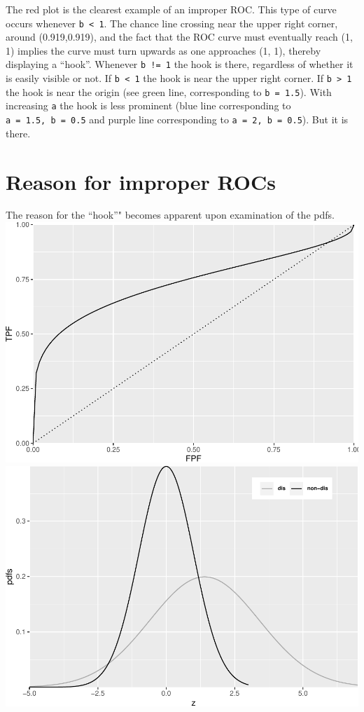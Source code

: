 \documentclass[]{book}
\begin{document}
The red plot is the clearest example of an improper ROC. This type of curve occurs whenever \texttt{b\ \textless{}\ 1}. The chance line crossing near the upper right corner, around (0.919,0.919), and the fact that the ROC curve must eventually reach (1, 1) implies the curve must turn upwards as one approaches (1, 1), thereby displaying a ``hook''. Whenever \texttt{b\ !=\ 1} the hook is there, regardless of whether it is easily visible or not. If \texttt{b\ \textless{}\ 1} the hook is near the upper right corner. If \texttt{b\ \textgreater{}\ 1} the hook is near the origin (see green line, corresponding to \texttt{b\ =\ 1.5}). With increasing \texttt{a} the hook is less prominent (blue line corresponding to \texttt{a\ =\ 1.5,\ b\ =\ 0.5} and purple line corresponding to \texttt{a\ =\ 2,\ b\ =\ 0.5}). But it is there.

\hypertarget{reason-for-improper-rocs}{%
\section{Reason for improper ROCs}\label{reason-for-improper-rocs}}

The reason for the ``hook''" becomes apparent upon examination of the pdfs.
\includegraphics{21-improperROCs_files/figure-latex/unnamed-chunk-2-1.pdf} \includegraphics{21-improperROCs_files/figure-latex/unnamed-chunk-2-2.pdf}
\end{document}
